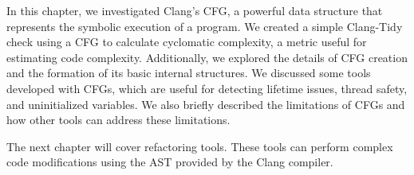 In this chapter, we investigated Clang’s CFG, a powerful data structure that represents the symbolic execution of a program. We created a simple Clang-Tidy check using a CFG to calculate cyclomatic complexity, a metric useful for estimating code complexity. Additionally, we explored the details of CFG creation and the formation of its basic internal structures. We discussed some tools developed with CFGs, which are useful for detecting lifetime issues, thread safety, and uninitialized variables. We also briefly described the limitations of CFGs and how other tools can address these limitations.

The next chapter will cover refactoring tools. These tools can perform complex code modifications using the AST provided by the Clang compiler.